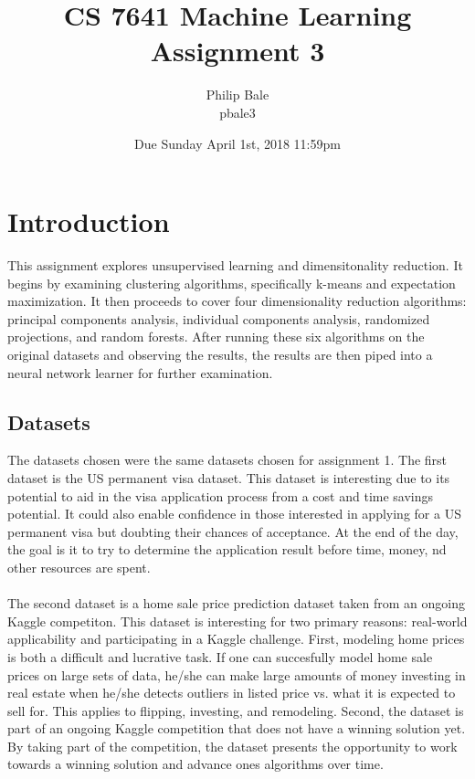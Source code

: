 \documentclass[h]{article}
\title{CS 7641 Machine Learning \\ Assignment 3}
\date{Due Sunday April 1st, 2018 11:59pm}
\author{Philip Bale \\ pbale3}
\begin{document}
\maketitle

\section*{Introduction}  
This assignment explores unsupervised learning and dimensitonality reduction.  
It begins by examining clustering algorithms, specifically k-means and 
expectation maximization.  It then proceeds to cover four dimensionality 
reduction algorithms: principal components analysis, individual components 
analysis, randomized projections, and random forests.  After running these six 
algorithms on the original datasets and observing the results, the results are 
then piped into a neural network learner for further examination.

\subsection*{Datasets}  
The datasets chosen were the same datasets chosen for assignment 1.  The first dataset is the US 
permanent visa dataset.  This dataset is interesting due to its potential to aid in the visa application process 
from a cost and time savings potential. It could also enable confidence in those interested in applying for a 
US permanent visa but doubting their chances of acceptance. 
At the end of the day, the goal is it to try to determine the application result before time, money, 
nd other resources are spent. 
\\  \\
The second dataset is a home sale price prediction dataset taken from an ongoing 
Kaggle competiton.  This dataset is interesting for two primary reasons: real-world applicability and participating in a Kaggle challenge.
 First, modeling home prices is both a difficult and lucrative task. 
 If one can succesfully model home sale prices on large sets of data, he/she can make large amounts of money 
 investing in real estate when he/she detects outliers in listed price vs. what it is expected to sell for. 
 This applies to flipping, investing, and remodeling. 
 Second, the dataset is part of an ongoing Kaggle competition that does not have a winning solution yet.
  By taking part of the competition, the dataset presents the opportunity to work towards a winning solution 
  and advance ones algorithms over time.
\end{document}
